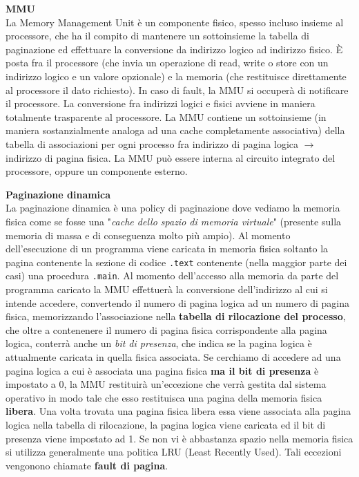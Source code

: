 \begin{defn}
    \textbf{MMU} \\
    La Memory Management Unit è un componente fisico, spesso incluso insieme al
    processore, che ha il compito di mantenere un sottoinsieme la tabella di
    paginazione ed effettuare la conversione da indirizzo logico ad indirizzo
    fisico. È posta fra il processore (che invia un operazione di read, write o
    store con un indirizzo logico e un valore opzionale) e la memoria (che
    restituisce direttamente al processore il dato richiesto). In caso di fault,
    la MMU si occuperà di notificare il processore. La conversione fra indirizzi
    logici e fisici avviene in maniera totalmente trasparente al processore. La
    MMU contiene un sottoinsieme (in maniera sostanzialmente analoga ad una
    cache completamente associativa) della tabella di associazioni per ogni
    processo fra indirizzo di pagina logica $\rightarrow$ indirizzo di pagina
    fisica. La MMU può essere interna al circuito integrato del processore,
    oppure un componente esterno.
\end{defn}

\begin{defn}
    \textbf{Paginazione dinamica} \\
    La paginazione dinamica è una policy di paginazione dove vediamo la memoria
    fisica come se fosse una "\textit{cache dello spazio di memoria virtuale}"
    (presente sulla memoria di massa e di conseguenza molto più ampio). Al
    momento dell'esecuzione di un programma viene caricata in memoria fisica
    soltanto la pagina contenente la sezione di codice \texttt{.text} contenente
    (nella maggior parte dei casi) una procedura \texttt{.main}. Al momento
    dell'accesso alla memoria da parte del programma caricato la MMU effettuerà
    la conversione dell'indirizzo al cui si intende accedere, convertendo il
    numero di pagina logica ad un numero di pagina fisica, memorizzando
    l'associazione nella \textbf{tabella di rilocazione del processo}, che oltre
    a contenenere il numero di pagina fisica corrispondente alla pagina logica,
    conterrà anche un \textit{bit di presenza}, che indica se la pagina logica è
    attualmente caricata in quella fisica associata. Se cerchiamo di accedere ad
    una pagina logica a cui è associata una pagina fisica \textbf{ma il bit di
    presenza} è impostato a 0, la MMU restituirà un'eccezione che verrà gestita
    dal sistema operativo in modo tale che esso restituisca una pagina della
    memoria fisica \textbf{libera}. Una volta trovata una pagina fisica libera
    essa viene associata alla pagina logica nella tabella di rilocazione, la
    pagina logica viene caricata ed il bit di presenza viene impostato ad 1. Se
    non vi è abbastanza spazio nella memoria fisica si utilizza generalmente una
    politica LRU (Least Recently Used). Tali eccezioni vengonono chiamate
    \textbf{fault di pagina}.
\end{defn}

